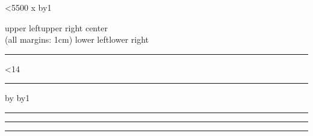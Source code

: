 \documentclass[a4paper,10pt,BCOR=10mm,twoside]{scrartcl}
\begin{document}
\begin{fullminipage}
  \loop\ifnum\mycount<5500
    x
    \advance\mycount by1
  \repeat
\end{fullminipage}

\begin{fullminipage}[top=1cm,left=1cm,right=1cm,bottom=1cm]
  upper left\hfill upper right
  \vfill
  \centering
  center\\
  (all margins: 1cm)
  \vfill
  lower left\hfill lower right
\end{fullminipage}

\begin{fullminipage}[top=1cm,left=1cm,right=1cm,bottom=1cm]
  \rule{\hsize}{\vsize}
\end{fullminipage}

\begin{fullminipage}[bgcolor]
  \color{white}%
  \loop\ifnum\mycount<14
    \par\nointerlineskip\leavevmode
    \kern\mydimenkern\rule{\mydimensize}{\mydimensize}%
    \advance\mydimenkern by\mydimensize
    \mydimensize
    \advance\mycount by1
  \repeat
  \vfill
  \rule{3pt}{3pt}\hfill\rule{0.96\hsize}{3pt}\hfill\rule{3pt}{3pt}
\end{fullminipage}
\end{document}
